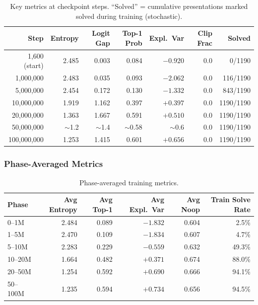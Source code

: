 \documentclass[11pt,a4paper]{article}
\begin{document}
\begin{table}[h]
\centering
\caption{Key metrics at checkpoint steps.  ``Solved'' = cumulative presentations marked solved during training (stochastic).}
\label{tab:metric-trajectory}
\small
\begin{tabular}{rrrrrrr}
  \toprule
  \textbf{Step} & \textbf{Entropy} & \textbf{Logit Gap} & \textbf{Top-1 Prob} & \textbf{Expl.\ Var} & \textbf{Clip Frac} & \textbf{Solved} \\
  \midrule
  1{,}600 (start)  & 2.485 & 0.003 & 0.084 & $-0.920$ & 0.0 & 0/1190 \\
  1{,}000{,}000    & 2.483 & 0.035 & 0.093 & $-2.062$ & 0.0 & 116/1190 \\
  5{,}000{,}000    & 2.454 & 0.172 & 0.130 & $-1.332$ & 0.0 & 843/1190 \\
  10{,}000{,}000   & 1.919 & 1.162 & 0.397 & $+0.397$ & 0.0 & 1190/1190 \\
  20{,}000{,}000   & 1.363 & 1.667 & 0.591 & $+0.510$ & 0.0 & 1190/1190 \\
  50{,}000{,}000   & $\sim$1.2  & $\sim$1.4  & $\sim$0.58  & $\sim$0.6  & 0.0 & 1190/1190 \\
  100{,}000{,}000  & 1.253 & 1.415 & 0.601 & $+0.656$ & 0.0 & 1190/1190 \\
  \bottomrule
\end{tabular}
\end{table}

\subsubsection{Phase-Averaged Metrics}

\begin{table}[h]
\centering
\caption{Phase-averaged training metrics.}
\label{tab:phase-avg}
\small
\begin{tabular}{lrrrrr}
  \toprule
  \textbf{Phase} & \textbf{Avg Entropy} & \textbf{Avg Top-1} & \textbf{Avg Expl.\ Var} & \textbf{Avg Noop} & \textbf{Train Solve Rate} \\
  \midrule
  0--1M   & 2.484 & 0.089 & $-1.832$ & 0.604 & 2.5\% \\
  1--5M   & 2.470 & 0.109 & $-1.834$ & 0.607 & 4.7\% \\
  5--10M  & 2.283 & 0.229 & $-0.559$ & 0.632 & 49.3\% \\
  10--20M & 1.664 & 0.482 & $+0.371$ & 0.674 & 88.0\% \\
  20--50M & 1.254 & 0.592 & $+0.690$ & 0.666 & 94.1\% \\
  50--100M & 1.235 & 0.594 & $+0.734$ & 0.656 & 94.5\% \\
  \bottomrule
\end{tabular}
\end{table}
\end{document}
